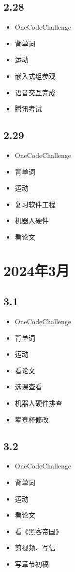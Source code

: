 \documentclass[UTF8]{ctexart}
\begin{document}
\subsection*{2.28}
\begin{itemize}
    \item OneCodeChallenge
    \item 背单词
    \item 运动
    \item 嵌入式组参观
    \item 语音交互完成
    \item 腾讯考试
\end{itemize}

\subsection*{2.29}
\begin{itemize}
    \item OneCodeChallenge
    \item 背单词
    \item 运动
    \item 复习软件工程
    \item 机器人硬件
    \item 看论文
\end{itemize}

\section*{2024年3月}

\subsection*{3.1}
\begin{itemize}
    \item OneCodeChallenge
    \item 背单词
    \item 运动
    \item 看论文
    \item 选课查看
    \item 机器人硬件排查
    \item 攀登杯修改
\end{itemize}

\subsection*{3.2}
\begin{itemize}
    \item OneCodeChallenge
    \item 背单词
    \item 运动
    \item 看论文
    \item 看《黑客帝国》
    \item 剪视频、写信
    \item 写章节初稿
\end{itemize}
\end{document}
